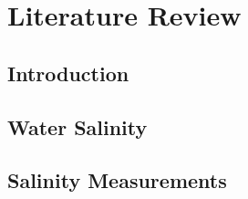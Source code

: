 \chapter{Literature Review}
\section{Introduction}

\section{Water Salinity}

\section{Salinity Measurements}



